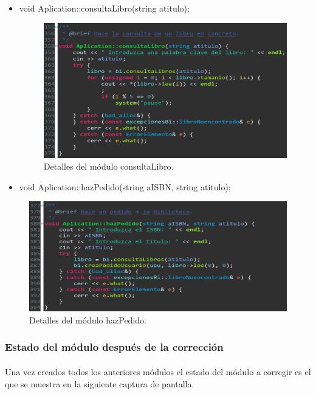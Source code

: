 \begin{itemize}
			\item void Aplication::consultaLibro(string atitulo);
			
			\begin{figure}[H]
				\centering
				\includegraphics[scale=0.9]{img/estebanFinal7.png}
				\caption{Detalles del módulo consultaLibro.}
				\label{estebanFinal7}
			\end{figure}
		
			\item void Aplication::hazPedido(string aISBN, string atitulo);
		\end{itemize}
	
			\begin{figure}[H]
				\centering
				\includegraphics[scale=0.9]{img/estebanFinal8.png}
				\caption{Detalles del módulo hazPedido.}
				\label{estebanFinal8}
			\end{figure}
	
	\subsubsection{Estado del módulo después de la corrección}
	
		\paragraph{}Una vez creados todos los anteriores módulos el estado del módulo a corregir es el que se muestra en la siguiente captura de pantalla.
		
